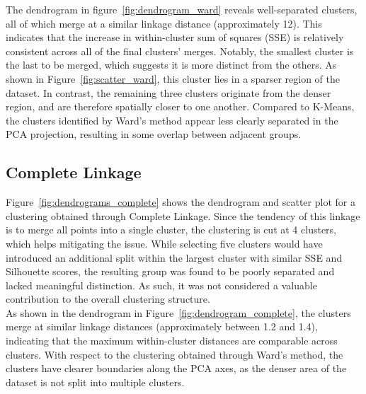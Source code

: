 The dendrogram in figure~\ref{fig:dendrogram_ward} reveals well-separated clusters, all of which merge at a
similar linkage distance (approximately 12). This indicates that the increase in within-cluster sum of
squares (SSE) is relatively consistent across all of the final clusters' merges.
Notably, the smallest cluster is the last to be merged, which suggests it is more distinct from the others.
As shown in Figure~\ref{fig:scatter_ward}, this cluster lies in a sparser region of the dataset.
In contrast, the remaining three clusters originate from the denser region, and are therefore spatially
closer to one another.
Compared to K-Means, the clusters identified by Ward's method appear less clearly separated in the PCA
projection, resulting in some overlap between adjacent groups.





\subsection{Complete Linkage}
Figure~\ref{fig:dendrograms_complete} shows the dendrogram and scatter plot for a clustering obtained
through Complete Linkage.
Since the tendency of this linkage is to merge all points into a single cluster, the clustering is cut at 4 clusters,
which helps mitigating the issue. While selecting five clusters would have introduced an additional split
within the largest cluster with similar SSE and Silhouette scores, the resulting group was found to be
poorly separated and lacked meaningful distinction.
As such, it was not considered a valuable contribution to the overall clustering structure.\\

As shown in the dendrogram in Figure~\ref{fig:dendrogram_complete}, the clusters merge at similar linkage
distances (approximately between 1.2 and 1.4), indicating that the maximum within-cluster distances are
comparable across clusters. With respect to the clustering obtained through Ward's method, the clusters
have clearer boundaries along the PCA axes, as the denser area of the dataset is not split into multiple
clusters.\\

